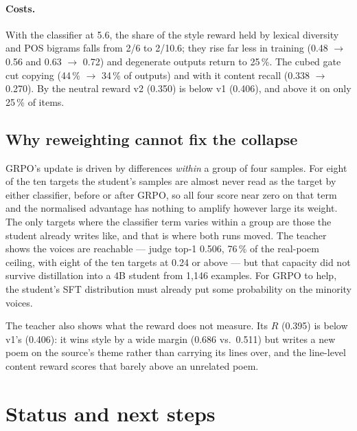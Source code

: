 \documentclass[11pt]{article}
\begin{document}
\paragraph{Costs.} With the classifier at 5.6, the share of the style reward
held by lexical diversity and POS bigrams falls from 2/6 to 2/10.6; they rise
far less in training (0.48 $\to$ 0.56 and 0.63 $\to$ 0.72) and degenerate
outputs return to 25\,\%. The cubed gate cut copying (44\,\% $\to$ 34\,\% of
outputs) and with it content recall (0.338 $\to$ 0.270). By the neutral reward
v2 (0.350) is below v1 (0.406), and above it on only 25\,\% of items.

\subsection{Why reweighting cannot fix the collapse}

GRPO's update is driven by differences \emph{within} a group of four samples.
For eight of the ten targets the student's samples are almost never read as
the target by either classifier, before or after GRPO, so all four score near
zero on that term and the normalised advantage has nothing to amplify however
large its weight. The only targets where the classifier term varies within a
group are those the student already writes like, and that is where both runs
moved. The teacher shows the voices are reachable --- judge top-1 0.506, 76\,\%
of the real-poem ceiling, with eight of the ten targets at 0.24 or above --- but that capacity
did not survive distillation into a 4B student from 1{,}146 examples. For GRPO
to help, the student's SFT distribution must already put some probability on
the minority voices.

The teacher also shows what the reward does not measure. Its $R$ (0.395) is
below v1's (0.406): it wins style by a wide margin (0.686 vs.\ 0.511) but
writes a new poem on the source's theme rather than carrying its lines over,
and the line-level content reward scores that barely above an unrelated poem.

\section{Status and next steps}\label{sec:next}
\end{document}
